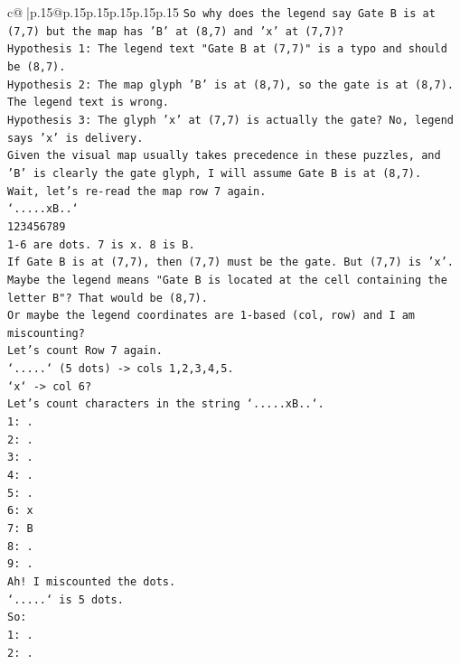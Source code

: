 \documentclass{article}
\begin{document}
{\begin{supertabular}{c@{$\;$}|p{.15\linewidth}@{}p{.15\linewidth}p{.15\linewidth}p{.15\linewidth}p{.15\linewidth}p{.15\linewidth}}
{{{\texttt{So why does the legend say Gate B is at (7,7) but the map has 'B' at (8,7) and 'x' at (7,7)?} \\
\texttt{Hypothesis 1: The legend text "Gate B at (7,7)" is a typo and should be (8,7).} \\
\texttt{Hypothesis 2: The map glyph 'B' is at (8,7), so the gate is at (8,7). The legend text is wrong.} \\
\texttt{Hypothesis 3: The glyph 'x' at (7,7) is actually the gate? No, legend says 'x' is delivery.} \\
\texttt{Given the visual map usually takes precedence in these puzzles, and 'B' is clearly the gate glyph, I will assume Gate B is at (8,7).} \\
\texttt{Wait, let's re{-}read the map row 7 again.} \\
\texttt{`.....xB..`} \\
\texttt{123456789} \\
\texttt{1{-}6 are dots. 7 is x. 8 is B.} \\
\texttt{If Gate B is at (7,7), then (7,7) must be the gate. But (7,7) is 'x'.} \\
\texttt{Maybe the legend means "Gate B is located at the cell containing the letter B"? That would be (8,7).} \\
\texttt{Or maybe the legend coordinates are 1{-}based (col, row) and I am miscounting?} \\
\texttt{Let's count Row 7 again.} \\
\texttt{`.....` (5 dots) {-}> cols 1,2,3,4,5.} \\
\texttt{`x` {-}> col 6?} \\
\texttt{Let's count characters in the string `.....xB..`.} \\
\texttt{1: .} \\
\texttt{2: .} \\
\texttt{3: .} \\
\texttt{4: .} \\
\texttt{5: .} \\
\texttt{6: x} \\
\texttt{7: B} \\
\texttt{8: .} \\
\texttt{9: .} \\
\texttt{Ah! I miscounted the dots.} \\
\texttt{`.....` is 5 dots.} \\
\texttt{So:} \\
\texttt{1: .} \\
\texttt{2: .} \\
}}}
\end{supertabular}}
\end{document}
